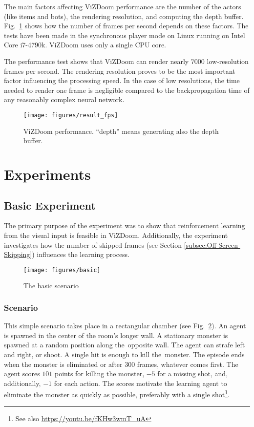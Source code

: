 \documentclass[english,american,conference, balance]{IEEEtran}
\begin{document}
The main factors affecting ViZDoom performance are the number of the
actors (like items and bots), the rendering resolution, and computing
the depth buffer. Fig.~\ref{fig:fps_test} shows how the number of
frames per second depends on these factors. The tests have been made
in the synchronous player mode on Linux running on Intel Core i7-4790k.
ViZDoom uses only a single CPU core.

The performance test shows that ViZDoom can render nearly $7000$
low-resolution frames per second. The rendering resolution proves
to be the most important factor influencing the processing speed.
In the case of low resolutions, the time needed to render one frame
is negligible compared to the backpropagation time of any reasonably
complex neural network.

\begin{figure}
\centering{}\texttt{[image: figures/result\_fps]}
\caption{\label{fig:fps_test}ViZDoom performance. ``depth'' means generating
also the depth buffer.}
\end{figure}


\section{Experiments\label{sec:Experiment}}

\subsection{Basic Experiment}

The primary purpose of the experiment was to show that reinforcement
learning from the visual input is feasible in ViZDoom. Additionally,
the experiment investigates how the number of skipped frames (see
Section \ref{subsec:Off-Screen-Skipping}) influences the learning
process.

\begin{figure}
\centering{}\texttt{[image: figures/basic]}
\caption{\label{fig:basic}The basic scenario }
\end{figure}


\subsubsection{Scenario}

This simple scenario takes place in a rectangular chamber (see Fig.~\ref{fig:basic}).
An agent is spawned in the center of the room's longer wall. A stationary
monster is spawned at a random position along the~opposite wall.
The agent can strafe left and right, or shoot. A single hit is enough
to kill the~monster. The episode ends when the monster is eliminated
or after $300$ frames, whatever comes first. The agent scores $101$
points for killing the monster, $-5$ for a missing shot, and, additionally,
$-1$ for each action. The scores motivate the learning agent to eliminate
the monster as quickly as possible, preferably with a single shot\footnote{See also \href{https://youtu.be/fKHw3wmT_uA}{https://youtu.be/fKHw3wmT\_{}uA}}.
\end{document}
